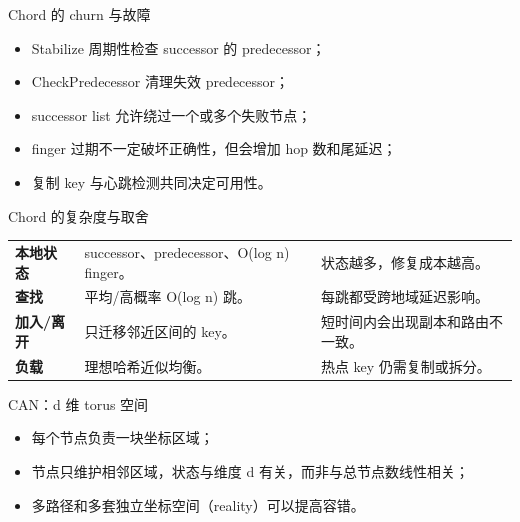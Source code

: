 \documentclass[UTF8,fontset=none,aspectratio=169,10pt]{beamer}
\begin{document}
\begin{frame}{Chord 的 churn 与故障}
\begin{itemize}
  \item Stabilize 周期性检查 successor 的 predecessor；
  \item CheckPredecessor 清理失效 predecessor；
  \item successor list 允许绕过一个或多个失败节点；
  \item finger 过期不一定破坏正确性，但会增加 hop 数和尾延迟；
  \item 复制 key 与心跳检测共同决定可用性。
\end{itemize}
\end{frame}

\begin{frame}{Chord 的复杂度与取舍}
\begin{tabularx}{\linewidth}{>{\bfseries}p{3.2cm}XX}
\toprule
本地状态 & successor、predecessor、O(log n) finger。 & 状态越多，修复成本越高。 \\
查找 & 平均/高概率 O(log n) 跳。 & 每跳都受跨地域延迟影响。 \\
加入/离开 & 只迁移邻近区间的 key。 & 短时间内会出现副本和路由不一致。 \\
负载 & 理想哈希近似均衡。 & 热点 key 仍需复制或拆分。 \\
\bottomrule
\end{tabularx}
\end{frame}


\begin{frame}{CAN：d 维 torus 空间}
\begin{center}
\end{center}
\vspace{-5mm}
\begin{itemize}
  \item 每个节点负责一块坐标区域；
  \item 节点只维护相邻区域，状态与维度 d 有关，而非与总节点数线性相关；
  \item 多路径和多套独立坐标空间（reality）可以提高容错。
\end{itemize}
\end{frame}
\end{document}
